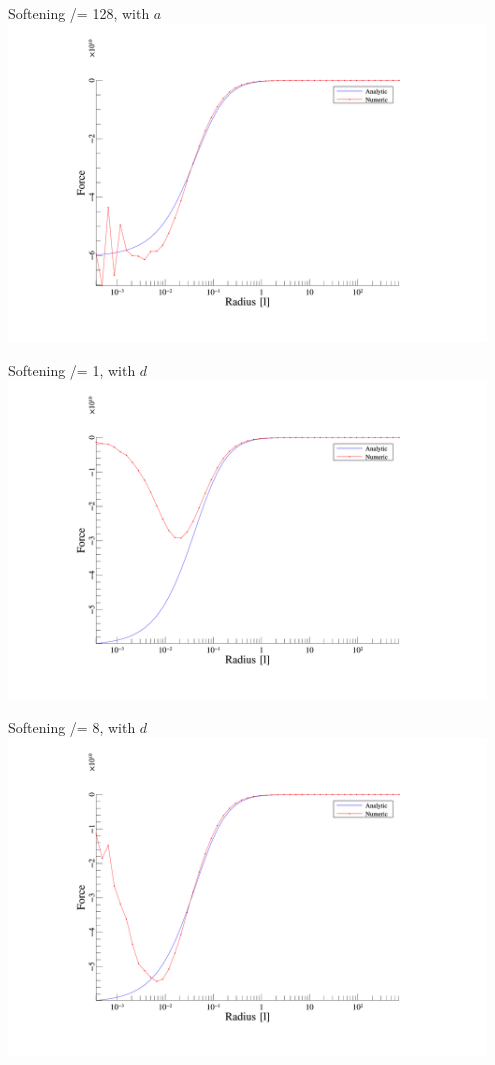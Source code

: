 \begin{frame}{Softening /= 128, with $a$}
	\includegraphics[width=0.95\textwidth]{figures/plots/forces_a_128.png}
\end{frame}

\begin{frame}{Softening /= 1, with $d$}
	\includegraphics[width=0.95\textwidth]{figures/plots/forces_d_1.png}
\end{frame}

\begin{frame}{Softening /= 8, with $d$}
	\includegraphics[width=0.95\textwidth]{figures/plots/forces_d_8.png}
\end{frame}

